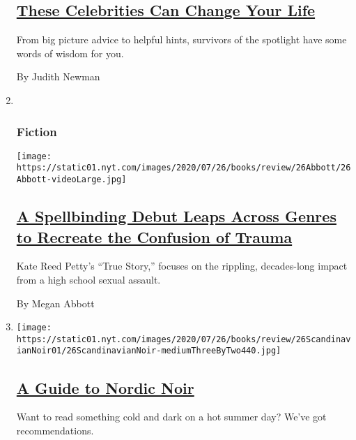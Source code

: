 \begin{enumerate}
  \hypertarget{these-celebrities-can-change-your-life}{%
  \subsection{\texorpdfstring{\href{/2020/07/28/books/review/hustle-harder-hustle-smarter-curtis-jackson.html}{These
  Celebrities Can Change Your
  Life}}{These Celebrities Can Change Your Life}}\label{these-celebrities-can-change-your-life}}

  From big picture advice to helpful hints, survivors of the spotlight
  have some words of wisdom for you.

  By Judith Newman
\item ~
  \hypertarget{fiction-2}{%
  \subsubsection{Fiction}\label{fiction-2}}

  \texttt{[image: https://static01.nyt.com/images/2020/07/26/books/review/26Abbott/26Abbott-videoLarge.jpg]}

  \hypertarget{a-spellbinding-debut-leaps-across-genres-to-recreate-the-confusion-of-trauma}{%
  \subsection{\texorpdfstring{\href{/2020/07/24/books/review/kate-reed-petty-true-story.html}{A
  Spellbinding Debut Leaps Across Genres to Recreate the Confusion of
  Trauma}}{A Spellbinding Debut Leaps Across Genres to Recreate the Confusion of Trauma}}\label{a-spellbinding-debut-leaps-across-genres-to-recreate-the-confusion-of-trauma}}

  Kate Reed Petty's ``True Story,'' focuses on the rippling,
  decades-long impact from a high school sexual assault.

  By Megan Abbott
\item
  \texttt{[image: https://static01.nyt.com/images/2020/07/26/books/review/26ScandinavianNoir01/26ScandinavianNoir-mediumThreeByTwo440.jpg]}

  \hypertarget{a-guide-to-nordic-noir}{%
  \subsection{\texorpdfstring{\href{/2020/07/24/books/review/nordic-noir-guide.html}{A
  Guide to Nordic
  Noir}}{A Guide to Nordic Noir}}\label{a-guide-to-nordic-noir}}

  Want to read something cold and dark on a hot summer day? We've got
  recommendations.


\end{enumerate}
